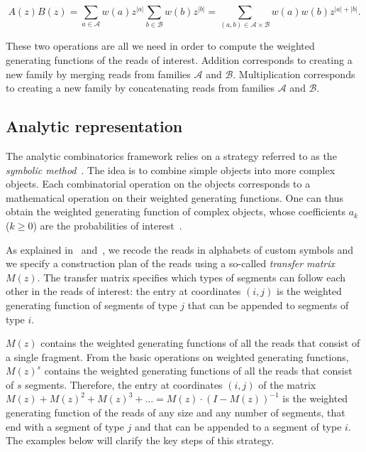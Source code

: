 \documentclass{article}
\begin{document}
\begin{equation*}
A(z)B(z) =
\sum_{a\in \mathcal{A}}w(a)z^{|a|} \sum_{b\in \mathcal{B}}w(b)z^{|b|}
= \sum_{(a,b) \in \mathcal{A} \times \mathcal{B}} w(a)w(b)z^{|a|+|b|}.
\end{equation*}

These two operations are all we need in order to compute the weighted
generating functions of the reads of interest. Addition corresponds to
creating a new family by merging reads from families $\mathcal{A}$ and
$\mathcal{B}$. Multiplication corresponds to creating a new family by
concatenating reads from families $\mathcal{A}$ and $\mathcal{B}$.

\subsection{Analytic representation}

The analytic combinatorics framework relies on a strategy referred to as
the \emph{symbolic method}~\cite{sedgewick2013introduction}. The idea is
to combine simple objects into more complex objects. Each combinatorial
operation on the objects corresponds to a mathematical operation on their
weighted generating functions. One can thus obtain the weighted generating
function of complex objects, whose coefficients $a_k$ ($k \geq 0$) are the
probabilities of interest~\cite{regnier2000unified, nicodeme2002motif,
sedgewick2013introduction}.

As explained in~\cite{filion2017analytic} and~\cite{filion2018analytic},
we recode the reads in alphabets of custom symbols and we specify a
construction plan of the reads using a so-called \emph{transfer matrix}
$M(z)$. The transfer matrix specifies which types of segments can follow
each other in the reads of interest: the entry at coordinates $(i,j)$ is
the weighted generating function of segments of type $j$ that can be
appended to segments of type $i$.

$M(z)$ contains the weighted generating functions of all the reads that
consist of a single fragment. From the basic operations on weighted
generating functions, $M(z)^s$ contains the weighted generating functions
of all the reads that consist of $s$ segments. Therefore, the entry at
coordinates $(i,j)$ of the matrix $M(z) + M(z)^2 + M(z)^3 + \ldots = M(z)
\cdot (I-M(z))^{-1}$ is the weighted generating function of the reads of
any size and any number of segments, that end with a segment of type $j$
and that can be appended to a segment of type $i$. The examples below will
clarify the key steps of this strategy.
\end{document}
